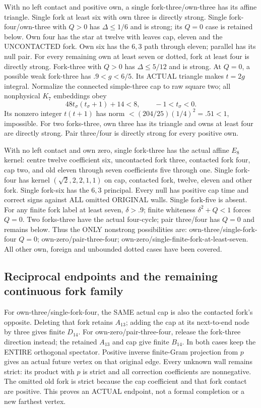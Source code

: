 \documentclass[11pt]{article}
\begin{document}
With no left contact and positive own, a single
fork-three/own-three has its affine triangle.
Single fork at least six with own three is directly
strong.
Single fork-four/own-three with \(Q>0\) has
\(\Delta\le1/6\) and is strong; its \(Q=0\)
case is retained below.
Own four has the star at twelve with leaves cap,
eleven and the UNCONTACTED fork.
Own six has the \(6,3\) path through eleven;
parallel has its null pair.
For every remaining own at least seven or dotted,
fork at least four is directly strong.
Fork-three with \(Q>0\) has \(\Delta\le5/12\)
and is strong.
At \(Q=0\), a possible weak fork-three has
\(.9<g<6/5\).
Its ACTUAL triangle makes \(t=2g\) integral.
Normalize the connected simple-three cap to raw
square two; all nonphysical \(K_7\) embeddings obey
\[
                  48t_\sigma(t_\sigma+1)+14<8,
                  \qquad -1<t_\sigma<0 .
\]
Its nonzero integer \(t(t+1)\) has norm
\(<(204/25)(1/4)^2=.51<1\), impossible.
For two forks-three, own three has its triangle
and owns at least four are directly strong.
Pair three/four is directly strong for every
positive own.

With no left contact and own zero, single
fork-three has the actual affine \(E_8\) kernel:
centre twelve coefficient six, uncontacted fork
three, contacted fork four, cap two, and old
eleven through seven coefficients five through one.
Single fork-four has kernel
\((\sqrt2,2,2,1,1)\) on
cap, contacted fork, twelve, eleven and other fork.
Single fork-six has the \(6,3\) principal.
Every null has positive cap time and correct signs
against ALL omitted ORIGINAL walls.
Single fork-five is absent.
For any finite fork label at least seven,
\(\delta>.9\); finite whiteness
\(\delta^2+Q<1\) forces \(Q=0\).
Two forks-three have the actual four-cycle;
pair three/four has \(Q=0\) and remains below.
Thus the ONLY nonstrong possibilities are:
own-three/single-fork-four \(Q=0\);
own-zero/pair-three-four;
own-zero/single-finite-fork-at-least-seven.
All other own, foreign and unbounded dotted cases
have been covered.

\subsection{Reciprocal endpoints and the remaining continuous fork family}
\label{app:arithD14typedexceptions}

For own-three/single-fork-four, the SAME actual cap
is also the contacted fork's opposite.
Deleting that fork retains \(A_{13}\); adding the
cap at its next-to-end node by three gives finite \(D_{14}\).
For own-zero/pair-three-four, release the fork-three
direction instead; the retained \(A_{13}\) and cap
give finite \(B_{14}\).
In both cases keep the ENTIRE orthogonal spectator.
Positive inverse finite-Gram projection from \(p\)
gives an actual future vertex on that original edge.
Every unknown wall remains strict: its product with
\(p\) is strict and all correction coefficients
are nonnegative.
The omitted old fork is strict because the cap
coefficient and that fork contact are positive.
This proves an ACTUAL endpoint, not a formal
completion or a new farthest vertex.
\end{document}

